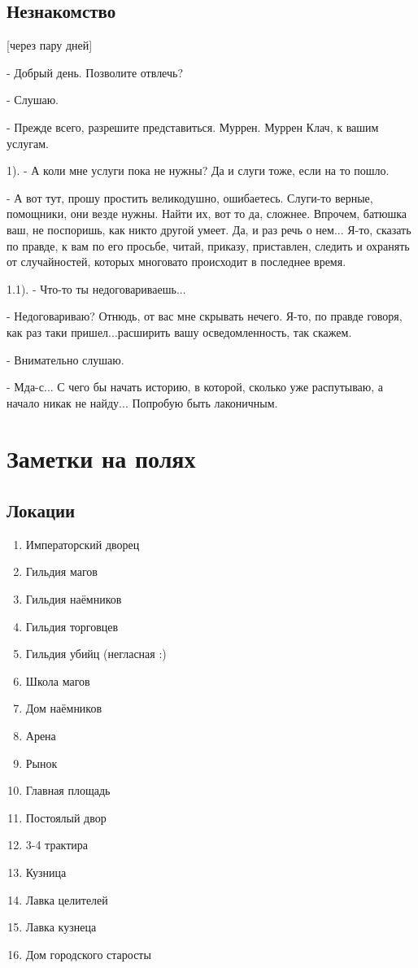 \documentclass[12pt,a4paper]{book}
\begin{document}
\section{Незнакомство}

[через пару дней]

- Добрый день. Позволите отвлечь?

- Слушаю.

- Прежде всего, разрешите представиться. Муррен. Муррен Клач, к вашим услугам.

1). - А коли мне услуги пока не нужны? Да и слуги тоже, если на то пошло.

- А вот тут, прошу простить великодушно, ошибаетесь. Слуги-то верные, помощники, они везде нужны. Найти их, вот то да, сложнее. Впрочем, батюшка ваш, не поспоришь, как никто другой умеет. Да, и раз речь о нем... Я-то, сказать по правде, к вам по его просьбе, читай, приказу, приставлен, следить и охранять от случайностей, которых многовато происходит в последнее время.

1.1). - Что-то ты недоговариваешь...

- Недоговариваю? Отнюдь, от вас мне скрывать нечего. Я-то, по правде говоря, как раз таки пришел...расширить вашу осведомленность, так скажем.

- Внимательно слушаю.

- Мда-с... С чего бы начать историю, в которой, сколько уже распутываю, а начало никак не найду... Попробую быть лаконичным.

\chapter*{Заметки на полях}

\section*{Локации}

\begin{enumerate}
\item Императорский дворец
\item Гильдия магов
\item Гильдия наёмников
\item Гильдия торговцев
\item Гильдия убийц (негласная :)
\item Школа магов
\item Дом наёмников
\item Арена
\item Рынок
\item Главная площадь
\item Постоялый двор
\item 3-4 трактира
\item Кузница
\item Лавка целителей
\item Лавка кузнеца
\item Дом городского старосты
\end{enumerate}
\end{document}
